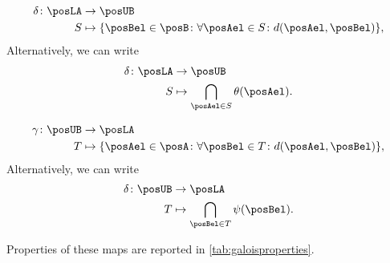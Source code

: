 \begin{equation}
    \label{eq:galoisdelta}
    \begin{aligned}
        \delta \colon \posLA&\to \posUB\\
        S&\mapsto \{\posBel\in \posB \colon \forall {\posAel\in S}\colon d(\posAel,\posBel)\},
    \end{aligned}
\end{equation}
Alternatively, we can write
\begin{equation}
    \begin{aligned}
        \delta\colon \posLA &\to \posUB\\
        S&\mapsto \bigcap_{\posAel\in S}\theta(\posAel).
    \end{aligned}
\end{equation}

\begin{equation}
    \label{eq:galoisgamma}
    \begin{aligned}
        \gamma \colon \posUB&\to \posLA\\
        T&\mapsto \{\posAel\in \posA \colon \forall {\posBel\in T}\colon d(\posAel,\posBel)\},
    \end{aligned}
\end{equation}
Alternatively, we can write
\begin{equation}
    \begin{aligned}
        \delta\colon \posUB &\to \posLA\\
        T&\mapsto \bigcap_{\posBel\in T}\psi(\posBel).
    \end{aligned}
\end{equation}

Properties of these maps are reported in \cref{tab:galoisproperties}.

